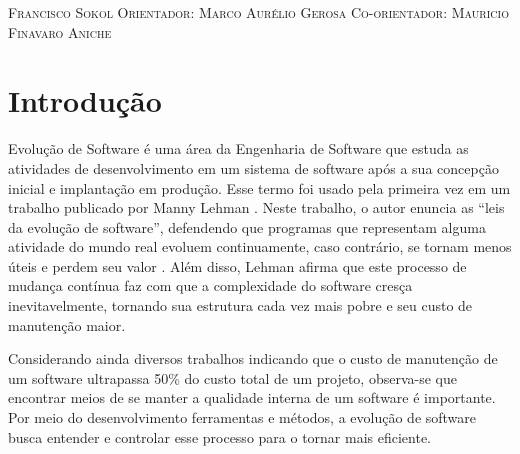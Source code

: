 \documentclass[a4paper, 12pt, twoside]{book}
\begin{document}
\begin{titlepage}
\vspace*{\fill}
\vspace{-5cm}
\vspace{2cm}
\center\textsc{{\Large Francisco Sokol}}
\vspace{1cm}
\center\textsc{{\large Orientador: Marco Aurélio Gerosa}}
\center\textsc{{\large Co-orientador: Mauricio Finavaro Aniche}}
\vfill
\end{titlepage}


\pagestyle{plain}

\setcounter{page}{1}

\tableofcontents

\newpage

\chapter{Introdução}

    Evolução de Software é uma área da Engenharia de Software que estuda as atividades de
    desenvolvimento em um sistema de software após a sua concepção inicial e implantação em
    produção. Esse termo foi usado pela primeira vez em um trabalho publicado por Manny 
    Lehman \cite{DBLP:series/springer/Mens08}. Neste trabalho, o autor enuncia as 
    ``leis da evolução de software'', defendendo que programas que representam alguma atividade
    do mundo real evoluem continuamente, caso contrário, se tornam menos úteis e perdem seu 
    valor \cite{Lehman1980b}. Além disso, Lehman afirma que este processo de mudança contínua
    faz com que a complexidade do software cresça inevitavelmente, tornando sua estrutura
    cada vez mais pobre e seu custo de manutenção maior.
    
    Considerando ainda diversos trabalhos indicando que o custo de manutenção de um software 
    ultrapassa 50\% do custo total de um projeto, observa-se que encontrar meios de se
    manter a qualidade interna de um software é importante. Por meio do desenvolvimento 
    ferramentas e métodos, a evolução de software busca entender e controlar esse processo
    para o tornar mais eficiente.
    
\end{document}
